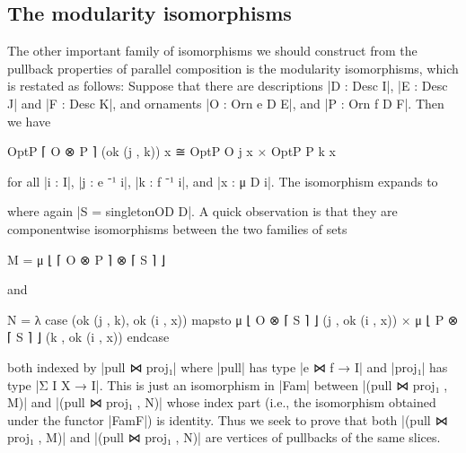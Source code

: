 \subsection{The modularity isomorphisms}
\label{sec:modularity-isomorphisms}

The other important family of isomorphisms we should construct from the pullback properties of parallel composition is the modularity isomorphisms, which is restated as follows:
Suppose that there are descriptions |D : Desc I|, |E : Desc J| and |F : Desc K|, and ornaments |O : Orn e D E|, and |P : Orn f D F|.
Then we have
\begin{code}
OptP ⌈ O ⊗ P ⌉ (ok (j , k)) x ≅ OptP O j x × OptP P k x
\end{code}
for all |i : I|, |j : e ⁻¹ i|, |k : f ⁻¹ i|, and |x : μ D i|.
The isomorphism expands to
where again |S = singletonOD D|.
A quick observation is that they are componentwise isomorphisms between the two families of sets
\savecolumns
\begin{code}
M  =  μ ⌊ ⌈ O ⊗ P ⌉ ⊗ ⌈ S ⌉ ⌋
\end{code}
and
\restorecolumns
\begin{code}
N  =  λ case  (ok (j , k), ok (i , x)) mapsto
                μ ⌊ O  ⊗ ⌈ S ⌉ ⌋ (j ,  ok (i , x)) × μ ⌊ P  ⊗ ⌈ S ⌉ ⌋ (k ,  ok (i , x)) endcase
\end{code}
both indexed by |pull ⋈ proj₁| where |pull| has type |e ⋈ f → I| and |proj₁| has type |Σ I X → I|.
This is just an isomorphism in |Fam| between |(pull ⋈ proj₁ , M)| and |(pull ⋈ proj₁ , N)| whose index part (i.e., the isomorphism obtained under the functor |FamF|) is identity.
Thus we seek to prove that both |(pull ⋈ proj₁ , M)| and |(pull ⋈ proj₁ , N)| are vertices of pullbacks of the same slices.

